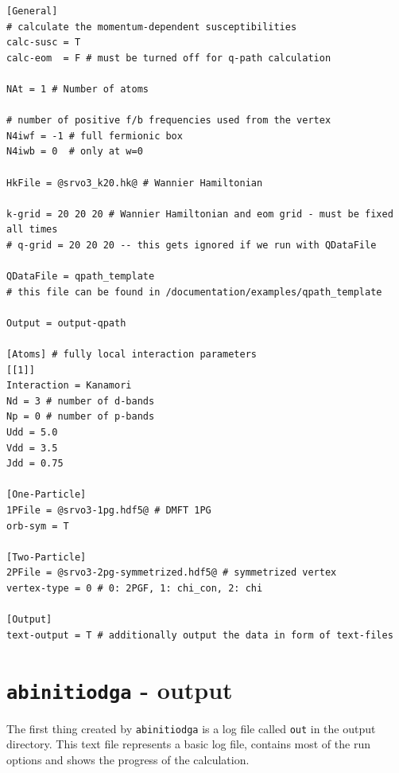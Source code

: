 \documentclass[a4paper,11pt]{article}
\numberwithin{equation}{section} %
\begin{document}
\newpage
\begin{lstlisting}[caption=config file for q-path calculation, frame=single, basicstyle=\small, style=base2,label={lst:configqpath}]
[General]
# calculate the momentum-dependent susceptibilities
calc-susc = T
calc-eom  = F # must be turned off for q-path calculation

NAt = 1 # Number of atoms

# number of positive f/b frequencies used from the vertex
N4iwf = -1 # full fermionic box
N4iwb = 0  # only at w=0

HkFile = @srvo3_k20.hk@ # Wannier Hamiltonian

k-grid = 20 20 20 # Wannier Hamiltonian and eom grid - must be fixed all times
# q-grid = 20 20 20 -- this gets ignored if we run with QDataFile

QDataFile = qpath_template
# this file can be found in /documentation/examples/qpath_template

Output = output-qpath

[Atoms] # fully local interaction parameters
[[1]]
Interaction = Kanamori
Nd = 3 # number of d-bands
Np = 0 # number of p-bands
Udd = 5.0
Vdd = 3.5
Jdd = 0.75

[One-Particle]
1PFile = @srvo3-1pg.hdf5@ # DMFT 1PG
orb-sym = T

[Two-Particle]
2PFile = @srvo3-2pg-symmetrized.hdf5@ # symmetrized vertex
vertex-type = 0 # 0: 2PGF, 1: chi_con, 2: chi

[Output]
text-output = T # additionally output the data in form of text-files
\end{lstlisting}
\newpage
\section{\protect\Verb+abinitiodga+ - output}
The first thing created by \verb+abinitiodga+ is a log file called \verb+out+ in the output directory. This text file represents a basic log file, contains most of the run options and shows the progress of the calculation.
\end{document}
